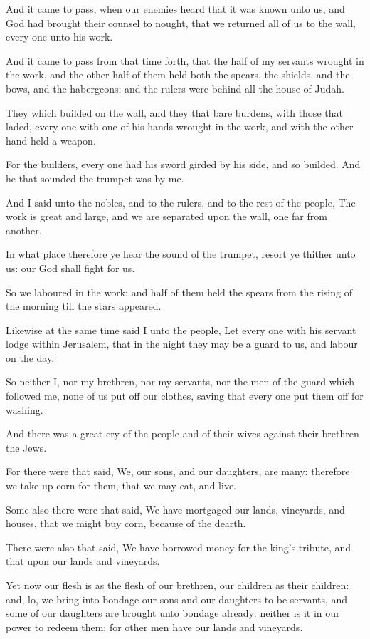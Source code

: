\Verse And it came to pass, when our enemies heard that it was known unto us, and God had brought their counsel to nought, that we returned all of us to the wall, every one unto his work.

\Verse And it came to pass from that time forth, that the half of my servants wrought in the work, and the other half of them held both the spears, the shields, and the bows, and the habergeons; and the rulers were behind all the house of Judah.

\Verse They which builded on the wall, and they that bare burdens, with those that laded, every one with one of his hands wrought in the work, and with the other hand held a weapon.

\Verse For the builders, every one had his sword girded by his side, and so builded. And he that sounded the trumpet was by me.

\Verse And I said unto the nobles, and to the rulers, and to the rest of the people, The work is great and large, and we are separated upon the wall, one far from another.

\Verse In what place therefore ye hear the sound of the trumpet, resort ye thither unto us: our God shall fight for us.

\Verse So we laboured in the work: and half of them held the spears from the rising of the morning till the stars appeared.

\Verse Likewise at the same time said I unto the people, Let every one with his servant lodge within Jerusalem, that in the night they may be a guard to us, and labour on the day.

\Verse So neither I, nor my brethren, nor my servants, nor the men of the guard which followed me, none of us put off our clothes, saving that every one put them off for washing.


\Chapter
\Verse And there was a great cry of the people and of their wives against their brethren the Jews.

\Verse For there were that said, We, our sons, and our daughters, are many: therefore we take up corn for them, that we may eat, and live.

\Verse Some also there were that said, We have mortgaged our lands, vineyards, and houses, that we might buy corn, because of the dearth.

\Verse There were also that said, We have borrowed money for the king's tribute, and that upon our lands and vineyards.

\Verse Yet now our flesh is as the flesh of our brethren, our children as their children: and, lo, we bring into bondage our sons and our daughters to be servants, and some of our daughters are brought unto bondage already: neither is it in our power to redeem them; for other men have our lands and vineyards.

